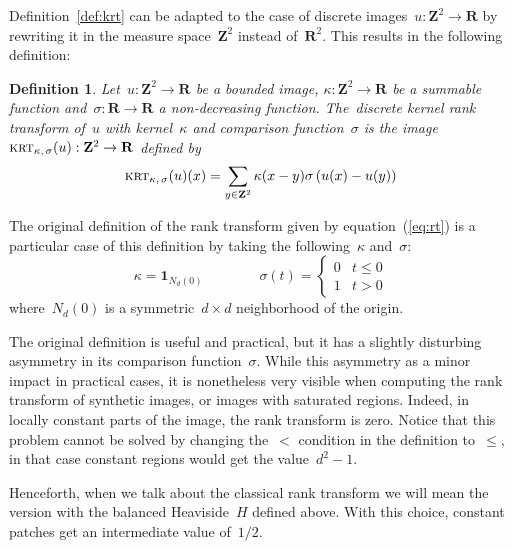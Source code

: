 \documentclass[12pt]{article}                  %
\newtheorem{definition}{Definition}
\def\parens#1{\left(#1\right)}
\begin{document}
Definition~\ref{def:krt} can be adapted to the case of discrete
images~$u:\mathbf{Z}^2\to\mathbf{R}$ by rewriting it in the measure
space~$\mathbf{Z}^2$ instead of~$\mathbf{R}^2$.  This results in the
following definition:

\begin{definition}\label{def:dkrt}
Let~$u:\mathbf{Z}^2\to\mathbf{R}$ be a bounded image,
$\kappa:\mathbf{Z}^2\to\mathbf{R}$ be a summable function
and~$\sigma:\mathbf{R}\to\mathbf{R}$ a non-decreasing function.
The~\emph{discrete kernel rank transform of~$u$ with kernel~$\kappa$
and comparison function~$\sigma$} is the
image~$\textsc{krt}_{\kappa,\,\sigma}(u):\mathbf{Z}^2\to\mathbf{R}$
defined by \begin{equation}\label{eq:rtdef}
	\textsc{krt}_{\kappa,\,\sigma}(u)(x) = \sum_{y\in\mathbf{Z}^2}\kappa(x-y)\sigma\parens{u(x)-u(y)}
\end{equation}
\end{definition}

The original definition of the rank transform given by
equation~(\ref{eq:rt}) is a particular case of this definition by taking
the following~$\kappa$ and~$\sigma$:
\[
	\kappa=\mathbf{1}_{N_d(0)}
	\qquad
	\qquad
	\sigma(t)=\begin{cases}0&t\le0\\1&t>0\end{cases}
\]
where~$N_d(0)$ is a symmetric~$d\times d$ neighborhood of the origin.

The original definition is useful and practical, but it has a slightly
disturbing asymmetry in its comparison function~$\sigma$.  While this
asymmetry as a minor impact in practical cases, it is nonetheless very
visible when computing the rank transform of synthetic images, or images
with saturated regions.  Indeed, in locally constant parts of the image, the
rank transform is zero.  Notice that this problem cannot be solved by
changing the~$<$ condition in the definition to~$\le$, in that case constant
regions would get the value~$d^2-1$.

Henceforth, when we talk about the classical rank transform we will mean the
version with the balanced Heaviside~$H$ defined above.  With this choice,
constant patches get an intermediate value of~$1/2$.
\end{document}
